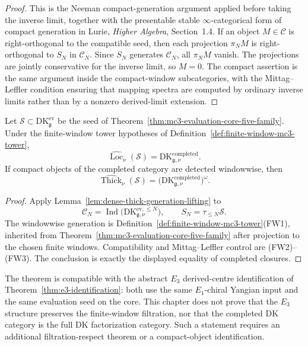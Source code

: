 \begin{proof}
This is the Neeman compact-generation argument applied before taking
the inverse limit, together with the presentable stable
$\infty$-categorical form of compact generation in Lurie,
\emph{Higher Algebra}, Section~1.4.  If an object
$M\in\mathcal C$ is right-orthogonal to the compatible seed, then
each projection $\pi_NM$ is right-orthogonal to $S_N$ in
$\mathcal C_N$.  Since $S_N$ generates $\mathcal C_N$, all
$\pi_NM$ vanish.  The projections are jointly conservative for the
inverse limit, so $M=0$.  The compact assertion is the same argument
inside the compact-window subcategories, with the
Mittag--Leffler condition ensuring that mapping spectra are computed
by ordinary inverse limits rather than by a nonzero derived-limit
extension.
\end{proof}

\begin{theorem}
\label{thm:mc3-full-DK-in-completed-category}
%
Let $\mathcal S\subset\mathrm{DK}^{\mathrm{ev}}_{\mathfrak g}$ be
the seed of Theorem~\ref{thm:mc3-evaluation-core-five-family}.
Under the finite-window tower hypotheses of
Definition~\ref{def:finite-window-mc3-tower},
\[
 \widehat{\operatorname{Loc}}_\nu(\mathcal S)
 =
 \mathrm{DK}^{\mathrm{completed}}_{\mathfrak g,\nu}.
\]
If compact objects of the completed category are detected windowwise,
then
\[
 \widehat{\operatorname{Thick}}_\nu(\mathcal S)
 =
 \bigl(\mathrm{DK}^{\mathrm{completed}}_{\mathfrak g,\nu}\bigr)^\omega.
\]
\end{theorem}

\begin{proof}
Apply Lemma~\ref{lem:dense-thick-generation-lifting} to
\[
\mathcal C_N=
\operatorname{Ind}
\bigl(\mathrm{DK}^{\mathrm{ev},\le N}_{\mathfrak g,\nu}\bigr),
\qquad
S_N=\tau_{\le N}\mathcal S.
\]
The windowwise generation is
Definition~\ref{def:finite-window-mc3-tower}(FW1), inherited from
Theorem~\ref{thm:mc3-evaluation-core-five-family} after projection to
the chosen finite windows.  Compatibility and Mittag--Leffler control
are (FW2)--(FW3).  The conclusion is exactly the displayed equality
of completed closures.
\end{proof}

\begin{remark}
\label{rem:compatibility-drinfeld-centre}
The theorem is compatible with the abstract $E_3$ derived-centre
identification of Theorem~\ref{thm:e3-identification}: both use the
same $E_1$-chiral Yangian input and the same evaluation seed on the
core.  This chapter does not prove that the $E_3$ structure preserves
the finite-window filtration, nor that the completed DK category is
the full DK factorization category.  Such a statement requires an
additional filtration-respect theorem or a compact-object
identification.
\end{remark}


